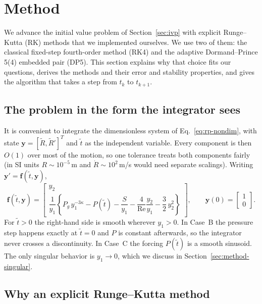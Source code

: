 \section{Method}
\label{sec:method}

We advance the initial value problem of Section~\ref{sec:ivp} with explicit Runge--Kutta (RK) methods that we implemented ourselves. We use two of them: the classical fixed-step fourth-order method (RK4) and the adaptive Dormand--Prince 5(4) embedded pair (DP5). This section explains why that choice fits our questions, derives the methods and their error and stability properties, and gives the algorithm that takes a step from $t_k$ to $t_{k+1}$.

\subsection{The problem in the form the integrator sees}

It is convenient to integrate the dimensionless system of Eq.~\eqref{eq:rp-nondim}, with state $\mathbf{y}=[\tilde R,\tilde R']^{T}$ and $\tilde t$ as the independent variable. Every component is then $O(1)$ over most of the motion, so one tolerance treats both components fairly (in SI units $R\sim10^{-5}$\,m and $\dot R\sim10^{2}$\,m/s would need separate scalings). Writing $\mathbf{y}'=\mathbf{f}(\tilde t,\mathbf{y})$,
\begin{equation}
\mathbf{f}(\tilde t,\mathbf{y}) =
\begin{bmatrix}
y_2\\[2pt]
\dfrac{1}{y_1}\left\{P_g\,y_1^{-3\kappa}-P(\tilde t)-\dfrac{S}{y_1}-\dfrac{4}{\mathrm{Re}}\dfrac{y_2}{y_1}-\dfrac32\,y_2^{2}\right\}
\end{bmatrix},
\qquad \mathbf{y}(0)=\begin{bmatrix}1\\0\end{bmatrix}.
\label{eq:rhs}
\end{equation}
For $\tilde t>0$ the right-hand side is smooth wherever $y_1>0$. In Case~B the pressure step happens exactly at $\tilde t=0$ and $P$ is constant afterwards, so the integrator never crosses a discontinuity. In Case~C the forcing $P(\tilde t)$ is a smooth sinusoid. The only singular behavior is $y_1\to0$, which we discuss in Section~\ref{sec:method-singular}.

\subsection{Why an explicit Runge--Kutta method}
\label{sec:method-why}

